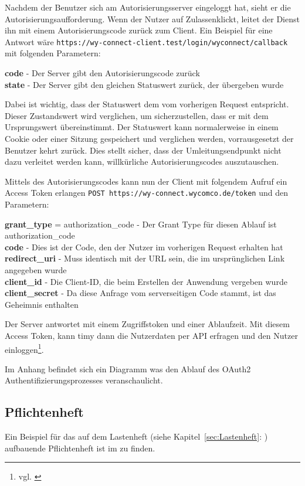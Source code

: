 Nachdem der Benutzer sich am Autorisierungsserver eingeloggt hat, sieht er die Autorisierungsaufforderung. Wenn der Nutzer auf \flqq Zulassen\frqq  klickt, leitet der Dienst ihn mit einem Autorisierungscode zurück zum Client. Ein Beispiel für eine Antwort wäre \texttt{https://wy-connect-client.test/login/wyconnect/callback} mit folgenden Parametern:

\textbf{code} - Der Server gibt den Autorisierungscode zurück \\
\textbf{state} - Der Server gibt den gleichen Statuswert zurück, der übergeben wurde

Dabei ist wichtig, dass der Statuswert dem vom vorherigen Request entspricht. Dieser Zustandswert wird verglichen, um sicherzustellen, dass er mit dem Ursprungswert übereinstimmt. Der Statuswert kann normalerweise in einem Cookie oder einer Sitzung gespeichert und verglichen werden, vorrausgesetzt der Benutzer kehrt zurück. Dies stellt sicher, dass der Umleitungsendpunkt nicht dazu verleitet werden kann, willkürliche Autorisierungscodes auszutauschen.

Mittels des Autorisierungscodes kann nun der Client mit folgendem Aufruf ein Access Token erlangen \texttt{POST https://wy-connect.wycomco.de/token} und den Parametern:
  
\textbf{grant\_type} = authorization\_code - Der Grant Type für diesen Ablauf ist authorization\_code \\
\textbf{code} - Dies ist der Code, den der Nutzer im vorherigen Request erhalten hat \\
\textbf{redirect\_uri} - Muss identisch mit der URL sein, die im ursprünglichen Link angegeben wurde \\
\textbf{client\_id} - Die Client-ID, die beim Erstellen der Anwendung vergeben wurde \\
\textbf{client\_secret} - Da diese Anfrage vom serverseitigen Code stammt, ist das Geheimnis enthalten

Der Server antwortet mit einem Zugriffstoken und einer Ablaufzeit. Mit diesem Access Token, kann timy dann die Nutzerdaten per API erfragen und den Nutzer einloggen\footnote{vgl. \cite{heise}}.

Im Anhang  befindet sich ein Diagramm was den Ablauf des OAuth2 Authentifizierungsprozesses veranschaulicht. 

\subsection{Pflichtenheft}
\label{sec:Pflichtenheft}

Ein Beispiel für das auf dem Lastenheft (siehe Kapitel~\ref{sec:Lastenheft}: ) aufbauende Pflichtenheft ist im  zu finden.

